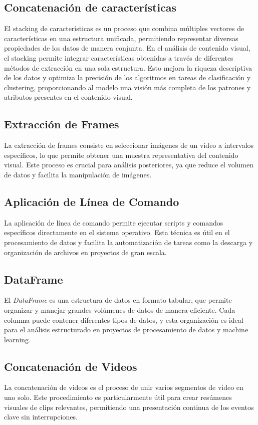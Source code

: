 \subsection{Concatenación de características}
El stacking de características es un proceso que combina múltiples vectores de características en una estructura unificada, permitiendo representar diversas propiedades de los datos de manera conjunta. En el análisis de contenido visual, el stacking permite integrar características obtenidas a través de diferentes métodos de extracción en una sola estructura. Esto mejora la riqueza descriptiva de los datos y optimiza la precisión de los algoritmos en tareas de clasificación y clustering, proporcionando al modelo una visión más completa de los patrones y atributos presentes en el contenido visual.


\subsection{Extracción de Frames}
La extracción de frames consiste en seleccionar imágenes de un video a intervalos específicos, lo que permite obtener una muestra representativa del contenido visual. Este proceso es crucial para análisis posteriores, ya que reduce el volumen de datos y facilita la manipulación de imágenes.

\subsection{Aplicación de Línea de Comando}
La aplicación de línea de comando permite ejecutar scripts y comandos específicos directamente en el sistema operativo. Esta técnica es útil en el procesamiento de datos y facilita la automatización de tareas como la descarga y organización de archivos en proyectos de gran escala.

\subsection{DataFrame}
El \textit{DataFrame} es una estructura de datos en formato tabular, que permite organizar y manejar grandes volúmenes de datos de manera eficiente. Cada columna puede contener diferentes tipos de datos, y esta organización es ideal para el análisis estructurado en proyectos de procesamiento de datos y machine learning.

\subsection{Concatenación de Videos}
La concatenación de videos es el proceso de unir varios segmentos de video en uno solo. Este procedimiento es particularmente útil para crear resúmenes visuales de clips relevantes, permitiendo una presentación continua de los eventos clave sin interrupciones.

